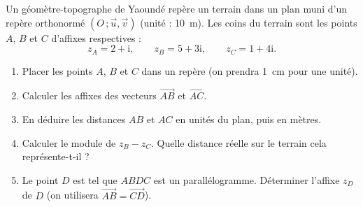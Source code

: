 \documentclass[11pt]{article}
\begin{document}
\begin{exercice}
Un géomètre-topographe de Yaoundé repère un terrain dans un plan muni d'un repère orthonormé $(O\,;\vec{u},\vec{v})$ (unité : \SI{10}{\meter}). Les coins du terrain sont les points $A$, $B$ et $C$ d'affixes respectives :
\[ z_A = 2 + \mathrm{i}, \qquad z_B = 5 + 3\mathrm{i}, \qquad z_C = 1 + 4\mathrm{i}. \]
\begin{enumerate}
\item Placer les points $A$, $B$ et $C$ dans un repère (on prendra \SI{1}{\centi\meter} pour une unité).
\item Calculer les affixes des vecteurs $\overrightarrow{AB}$ et $\overrightarrow{AC}$.
\item En déduire les distances $AB$ et $AC$ en unités du plan, puis en mètres.
\item Calculer le module de $z_B - z_C$. Quelle distance réelle sur le terrain cela représente-t-il ?
\item Le point $D$ est tel que $ABDC$ est un parallélogramme. Déterminer l'affixe $z_D$ de $D$ (on utilisera $\overrightarrow{AB} = \overrightarrow{CD}$).
\end{enumerate}
\end{exercice}
\end{document}
